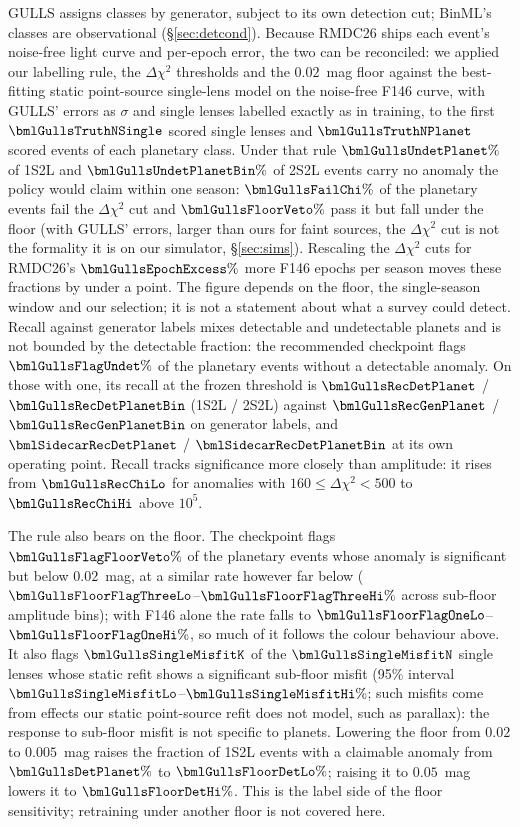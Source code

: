 GULLS assigns classes by generator, subject to its own detection cut; BinML's classes are observational
(\S\ref{sec:detcond}). Because RMDC26 ships each event's noise-free light curve and per-epoch error, the
two can be reconciled: we applied our labelling rule, the $\Delta\chi^2$ thresholds and the $0.02$~mag
floor against the best-fitting static point-source single-lens model on the noise-free F146 curve, with
GULLS' errors as $\sigma$ and single lenses labelled exactly as in training, to the first
$\bmlGullsTruthNSingle$ scored single lenses and $\bmlGullsTruthNPlanet$ scored events of each planetary
class. Under that rule $\bmlGullsUndetPlanet\%$ of 1S2L and
$\bmlGullsUndetPlanetBin\%$ of 2S2L events carry no anomaly the policy would claim within one season:
$\bmlGullsFailChi\%$ of the planetary events fail the $\Delta\chi^2$ cut and $\bmlGullsFloorVeto\%$ pass
it but fall under the floor (with GULLS' errors, larger than ours for faint sources, the $\Delta\chi^2$ cut
is not the formality it is on our simulator, \S\ref{sec:sims}). Rescaling the $\Delta\chi^2$ cuts for RMDC26's $\bmlGullsEpochExcess\%$ more F146 epochs per
season moves these fractions by under a point. The figure depends on the floor, the single-season window
and our selection; it is not a statement about what a survey could detect. Recall against generator
labels mixes detectable and undetectable planets and is not bounded by the detectable fraction: the
recommended checkpoint flags $\bmlGullsFlagUndet\%$ of the planetary events without a detectable
anomaly. On those with one, its recall at the frozen threshold is $\bmlGullsRecDetPlanet$ /
$\bmlGullsRecDetPlanetBin$ (1S2L / 2S2L) against $\bmlGullsRecGenPlanet$ / $\bmlGullsRecGenPlanetBin$ on
generator labels, and $\bmlSidecarRecDetPlanet$ / $\bmlSidecarRecDetPlanetBin$ at its own operating
point. Recall tracks significance more closely than amplitude: it rises from $\bmlGullsRecChiLo$ for
anomalies with $160 \le \Delta\chi^2 < 500$ to $\bmlGullsRecChiHi$ above $10^5$.

The rule also bears on the floor. The checkpoint flags $\bmlGullsFlagFloorVeto\%$ of the planetary events
whose anomaly is significant but below $0.02$~mag, at a similar rate however far below
($\bmlGullsFloorFlagThreeLo$--$\bmlGullsFloorFlagThreeHi\%$ across sub-floor amplitude bins); with F146
alone the rate falls to $\bmlGullsFloorFlagOneLo$--$\bmlGullsFloorFlagOneHi\%$, so much of it follows the
colour behaviour above. It also flags $\bmlGullsSingleMisfitK$ of the $\bmlGullsSingleMisfitN$ single
lenses whose static refit shows a significant sub-floor misfit (95\% interval
$\bmlGullsSingleMisfitLo$--$\bmlGullsSingleMisfitHi\%$; such misfits come from effects our static
point-source refit does not model, such as parallax): the response to sub-floor misfit is not specific
to planets. Lowering the floor from $0.02$ to
$0.005$~mag raises the fraction of 1S2L events with a claimable anomaly from $\bmlGullsDetPlanet\%$ to
$\bmlGullsFloorDetLo\%$; raising it to $0.05$~mag lowers it to $\bmlGullsFloorDetHi\%$. This is the
label side of the floor sensitivity; retraining under another floor is not covered here.

